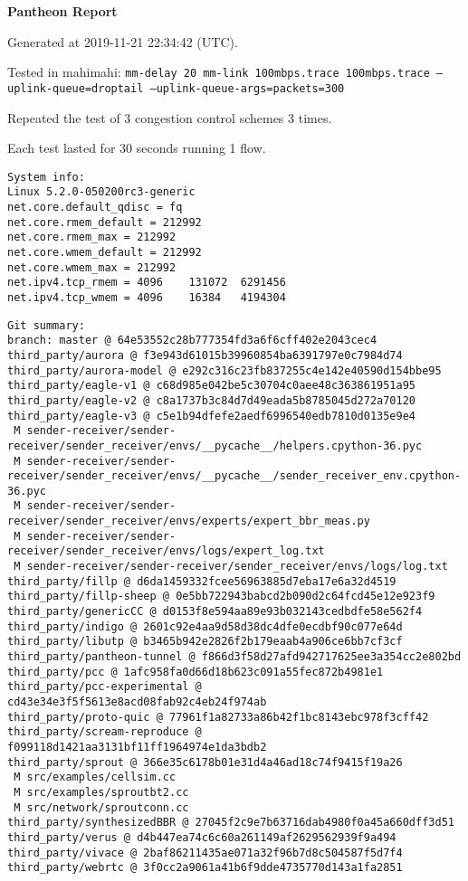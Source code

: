 \documentclass{article}
\begin{document}
\centerline{\textbf{\large{Pantheon Report}}}
\vspace{20pt}

Generated at 2019-11-21 22:34:42 (UTC).

Tested in mahimahi: \texttt{mm-delay 20 mm-link 100mbps.trace 100mbps.trace --uplink-queue=droptail --uplink-queue-args=packets=300}

Repeated the test of 3 congestion control schemes 3 times.

Each test lasted for 30 seconds running 1 flow.

\begin{verbatim}
System info:
Linux 5.2.0-050200rc3-generic
net.core.default_qdisc = fq
net.core.rmem_default = 212992
net.core.rmem_max = 212992
net.core.wmem_default = 212992
net.core.wmem_max = 212992
net.ipv4.tcp_rmem = 4096	131072	6291456
net.ipv4.tcp_wmem = 4096	16384	4194304
\end{verbatim}

\begin{verbatim}
Git summary:
branch: master @ 64e53552c28b777354fd3a6f6cff402e2043cec4
third_party/aurora @ f3e943d61015b39960854ba6391797e0c7984d74
third_party/aurora-model @ e292c316c23fb837255c4e142e40590d154bbe95
third_party/eagle-v1 @ c68d985e042be5c30704c0aee48c363861951a95
third_party/eagle-v2 @ c8a1737b3c84d7d49eada5b8785045d272a70120
third_party/eagle-v3 @ c5e1b94dfefe2aedf6996540edb7810d0135e9e4
 M sender-receiver/sender-receiver/sender_receiver/envs/__pycache__/helpers.cpython-36.pyc
 M sender-receiver/sender-receiver/sender_receiver/envs/__pycache__/sender_receiver_env.cpython-36.pyc
 M sender-receiver/sender-receiver/sender_receiver/envs/experts/expert_bbr_meas.py
 M sender-receiver/sender-receiver/sender_receiver/envs/logs/expert_log.txt
 M sender-receiver/sender-receiver/sender_receiver/envs/logs/log.txt
third_party/fillp @ d6da1459332fcee56963885d7eba17e6a32d4519
third_party/fillp-sheep @ 0e5bb722943babcd2b090d2c64fcd45e12e923f9
third_party/genericCC @ d0153f8e594aa89e93b032143cedbdfe58e562f4
third_party/indigo @ 2601c92e4aa9d58d38dc4dfe0ecdbf90c077e64d
third_party/libutp @ b3465b942e2826f2b179eaab4a906ce6bb7cf3cf
third_party/pantheon-tunnel @ f866d3f58d27afd942717625ee3a354cc2e802bd
third_party/pcc @ 1afc958fa0d66d18b623c091a55fec872b4981e1
third_party/pcc-experimental @ cd43e34e3f5f5613e8acd08fab92c4eb24f974ab
third_party/proto-quic @ 77961f1a82733a86b42f1bc8143ebc978f3cff42
third_party/scream-reproduce @ f099118d1421aa3131bf11ff1964974e1da3bdb2
third_party/sprout @ 366e35c6178b01e31d4a46ad18c74f9415f19a26
 M src/examples/cellsim.cc
 M src/examples/sproutbt2.cc
 M src/network/sproutconn.cc
third_party/synthesizedBBR @ 27045f2c9e7b63716dab4980f0a45a660dff3d51
third_party/verus @ d4b447ea74c6c60a261149af2629562939f9a494
third_party/vivace @ 2baf86211435ae071a32f96b7d8c504587f5d7f4
third_party/webrtc @ 3f0cc2a9061a41b6f9dde4735770d143a1fa2851
\end{verbatim}
\end{document}
